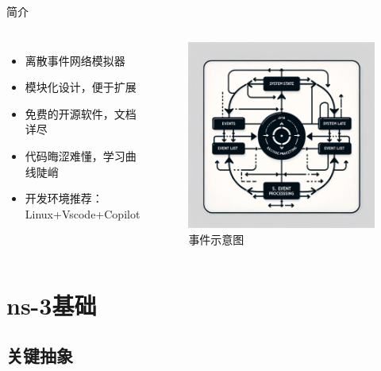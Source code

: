 \documentclass{beamer}
\begin{document}
\begin{frame}{简介}
	\begin{columns}
		\begin{itemize}
			\item 离散事件网络模拟器
			\item 模块化设计，便于扩展
			\item 免费的开源软件，文档详尽
			\item 代码晦涩难懂，学习曲线陡峭
			\item 开发环境推荐：Linux+Vscode+Copilot
		\end{itemize}

		\begin{figure}[h]
			\centering
			\includegraphics[height=0.5\textheight]{pic/events.png}
			\caption{事件示意图}
		\end{figure}

	\end{columns}
\end{frame}


\section{ns-3基础}

\subsection{关键抽象}
\end{document}
